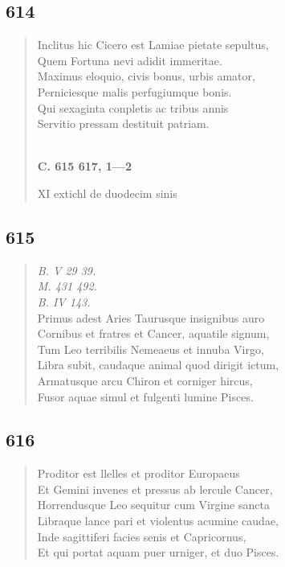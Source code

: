 \documentclass[11pt, a4paper]{report}
\begin{document}
            \subsection*{614}
      \begin{verse}
      Inclitus hic Cicero est Lamiae pietate sepultus, \\ Quem Fortuna nevi adidit immeritae. \\ Maximus eloquio, civis bonus, urbis amator, \\ Perniciesque malis perfugiumque bonis. \\ Qui sexaginta conpletis ac tribus annis \\ Servitio pressam destituit patriam. \\ 
        ﻿\pagebreak 
    \begin{center} \textbf{C. 615 617, 1—2} \end{center} \marginpar{[91]} XI  \lbrack extichl de duodecim sinis \\ 
      \end{verse}
  
            \subsection*{615}
      \begin{verse}
      \textit{B. V 29 39.} \\ \textit{M. 431 492.} \\ \textit{B. IV 143.} \\ Primus adest Aries Taurusque insignibus auro \\ Cornibus et fratres et Cancer, aquatile signum, \\ Tum Leo terribilis Nemeaeus et innuba Virgo, \\ Libra subit, caudaque animal quod dirigit ictum, \\ Armatusque arcu Chiron et corniger hircus, \\ Fusor aquae simul et fulgenti lumine Pisces. \\ 
      \end{verse}
  
            \subsection*{616}
      \begin{verse}
      Proditor est llelles et proditor Europaeus \\ Et Gemini invenes et pressus ab lercule Cancer, \\ Horrendusque Leo sequitur cum Virgine sancta \\ Libraque lance pari et violentus acumine caudae, \\ Inde sagittiferi facies senis et Capricornus, \\ Et qui portat aquam puer urniger, et duo Pisces. \\ 
      \end{verse}
  
\end{document}
